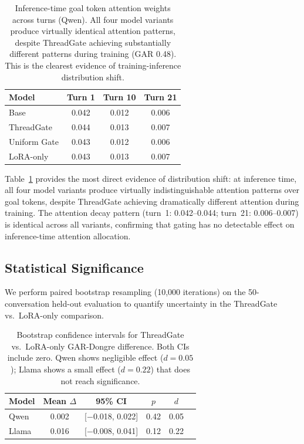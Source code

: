 \documentclass[11pt]{article}
\begin{document}
\begin{table}[t]
\centering
\small
\begin{tabular}{lccc}
\toprule
\textbf{Model} & \textbf{Turn 1} & \textbf{Turn 10} & \textbf{Turn 21} \\
\midrule
Base       & 0.042 & 0.012 & 0.006 \\
ThreadGate & 0.044 & 0.013 & 0.007 \\
Uniform Gate & 0.043 & 0.012 & 0.006 \\
LoRA-only  & 0.043 & 0.013 & 0.007 \\
\bottomrule
\end{tabular}
\caption{Inference-time goal token attention weights across turns (Qwen). All four model variants produce virtually identical attention patterns, despite ThreadGate achieving substantially different patterns during training (GAR 0.48). This is the clearest evidence of training-inference distribution shift.}
\label{tab:attention}
\end{table}

Table~\ref{tab:attention} provides the most direct evidence of distribution shift: at inference time, all four model variants produce virtually indistinguishable attention patterns over goal tokens, despite ThreadGate achieving dramatically different attention during training.
The attention decay pattern (turn~1: 0.042--0.044; turn~21: 0.006--0.007) is identical across all variants, confirming that gating has no detectable effect on inference-time attention allocation.

\subsection{Statistical Significance}
\label{sec:statistical}

We perform paired bootstrap resampling (10,000 iterations) on the 50-conversation held-out evaluation to quantify uncertainty in the ThreadGate vs.\ LoRA-only comparison.

\begin{table}[t]
\centering
\small
\begin{tabular}{lccccc}
\toprule
\textbf{Model} & \textbf{Mean $\Delta$} & \textbf{95\% CI} & \textbf{$p$} & \textbf{$d$} \\
\midrule
Qwen  & 0.002 & [$-$0.018, 0.022] & 0.42 & 0.05 \\
Llama & 0.016 & [$-$0.008, 0.041] & 0.12 & 0.22 \\
\bottomrule
\end{tabular}
\caption{Bootstrap confidence intervals for ThreadGate vs.\ LoRA-only GAR-Dongre difference. Both CIs include zero. Qwen shows negligible effect ($d{=}0.05$); Llama shows a small effect ($d{=}0.22$) that does not reach significance.}
\label{tab:bootstrap}
\end{table}
\end{document}

